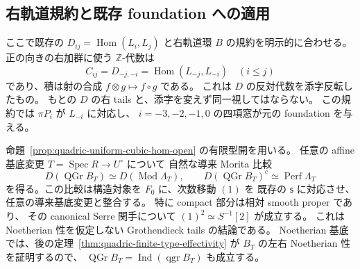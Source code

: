 \subsection{右軌道規約と既存 foundation への適用}

ここで既存の $D_{ij}=\operatorname{Hom}(L_i,L_j)$ と右軌道環
$B$ の規約を明示的に合わせる。正の向きの右加群に使う
$\mathbb Z$-代数は
\[
 C_{ij}=D_{-j,-i}=\operatorname{Hom}(L_{-j},L_{-i})\quad(i\le j)
 \tag{CT-right}\label{eq:cubic-tails-right-convention}
\]
であり、積は射の合成 $f\otimes g\mapsto f\circ g$ である。
これは $D$ の反対代数を添字反転したもの。
もとの $D$ の右 tails と、添字を変えず同一視してはならない。
この規約では $\pi P_i$ が $L_{-i}$ に対応し、
$i=-3,-2,-1,0$ の四項窓が元の foundation を与える。

\begin{proposition}
\label{prop:quadric-canonical-cubic-tails}
命題~\ref{prop:quadric-uniform-cubic-hom-open} の有限型開を用いる。
任意の affine 基底変更 $T=\operatorname{Spec}R\to U^\circ$ について
自然な導来 Morita 比較
\[
 D(\operatorname{QGr}B_T)\simeq D(\operatorname{Mod}\Lambda_T),\qquad
 D(\operatorname{QGr}B_T)^c\simeq\operatorname{Perf}\Lambda_T
 \tag{QT-compact}\label{eq:quadric-tails-compact-comparison}
\]
を得る。この比較は構造対象を $F_0$ に、次数移動 $(1)$ を
既存の $\mathsf s$ に対応させ、任意の導来基底変更と整合する。
特に compact 部分は相対 smooth proper であり、
その canonical Serre 関手について
$(1)^2\simeq S^{-1}[2]$ が成立する。
これは Noetherian 性を仮定しない Grothendieck tails の結論である。
Noetherian 基底では、後の定理~\ref{thm:quadric-finite-type-effectivity} が
$B_T$ の左右 Noetherian 性を証明するので、
$\operatorname{QGr}B_T=\operatorname{Ind}(\operatorname{qgr}B_T)$
も成立する。
\end{proposition}
